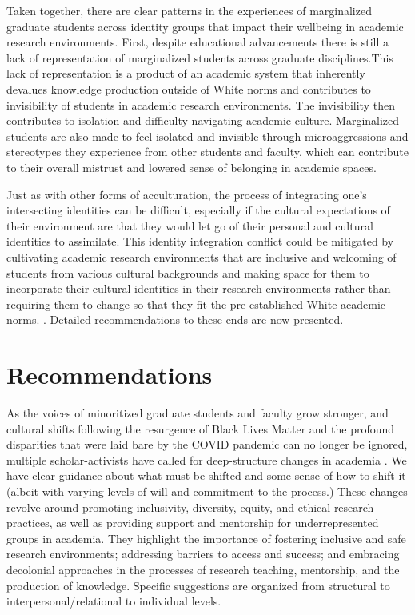 \documentclass[
  11pt,
]{book}
\begin{document}
Taken together, there are clear patterns in the experiences of marginalized graduate students across identity groups that impact their wellbeing in academic research environments. First, despite educational advancements there is still a lack of representation of marginalized students across graduate disciplines.This lack of representation is a product of an academic system that inherently devalues knowledge production outside of White norms and contributes to invisibility of students in academic research environments. The invisibility then contributes to isolation and difficulty navigating academic culture. Marginalized students are also made to feel isolated and invisible through microaggressions and stereotypes they experience from other students and faculty, which can contribute to their overall mistrust and lowered sense of belonging in academic spaces.

Just as with other forms of acculturation, the process of integrating one's intersecting identities can be difficult, especially if the cultural expectations of their environment are that they would let go of their personal and cultural identities to assimilate. This identity integration conflict could be mitigated by cultivating academic research environments that are inclusive and welcoming of students from various cultural backgrounds and making space for them to incorporate their cultural identities in their research environments rather than requiring them to change so that they fit the pre-established White academic norms. . Detailed recommendations to these ends are now presented.

\section{Recommendations}\label{recommendations}

As the voices of minoritized graduate students and faculty grow stronger, and cultural shifts following the resurgence of Black Lives Matter and the profound disparities that were laid bare by the COVID pandemic can no longer be ignored, multiple scholar-activists have called for deep-structure changes in academia \citep{galan_editorial_2021, haeger_creating_2021, kent_recommendations_2022, perez-lopez_ten_2022, posselt_rigor_2018, talusan_identity-conscious_2022, tung_making_2023, watkins_engaging_2018}. We have clear guidance about what must be shifted and some sense of how to shift it (albeit with varying levels of will and commitment to the process.) These changes revolve around promoting inclusivity, diversity, equity, and ethical research practices, as well as providing support and mentorship for underrepresented groups in academia. They highlight the importance of fostering inclusive and safe research environments; addressing barriers to access and success; and embracing decolonial approaches in the processes of research teaching, mentorship, and the production of knowledge. Specific suggestions are organized from structural to interpersonal/relational to individual levels.
\end{document}

